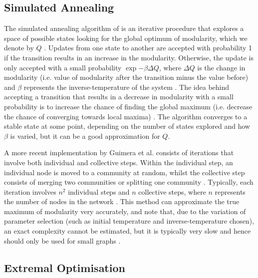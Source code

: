 
\subsection{Simulated Annealing}
\label{subsec:simulatedAnnealing}

The simulated annealing algorithm of \cite{KGV83} is an iterative procedure that explores a space of possible states looking for the global optimum of modularity, which we denote by $Q$ \cite{KGV83,For10}.
Updates from one state to another are accepted with probability 1 if the transition results in an increase in the modularity.
Otherwise, the update is only accepted with a small probability $\exp{-\beta \Delta Q}$, where $\Delta Q$ is the change in modularity (i.e. value of modularity after the transition minus the value before) and $\beta$ represents the inverse-temperature of the system \cite{KGV83,For10}.
The idea behind accepting a transition that results in a decrease in modularity with a small probability is to increase the chance of finding the global maximum (i.e. decrease the chance of converging towards local maxima) \cite{For10}.
The algorithm converges to a stable state at some point, depending on the number of states explored and how $\beta$ is varied, but it can be a good approximation for $Q$.

A more recent implementation by Guimera et al. \cite{GSA04} consists of iterations that involve both individual and collective steps.
Within the individual step, an individual node is moved to a community at random, whilst the collective step consists of merging two communities or splitting one community \cite{GSA04}.
Typically, each iteration involves $n^{2}$ individual steps and $n$ collective steps, where $n$ represents the number of nodes in the network \cite{For10}.
This method can approximate the true maximum of modularity very accurately, and note that, due to the variation of parameter selection (such as initial temperature and inverse-temperature chosen), an exact complexity cannot be estimated, but it is typically very slow and hence should only be used for small graphs \cite{For10}.


\subsection{Extremal Optimisation}
\label{subsec:extremalOptimisation}

